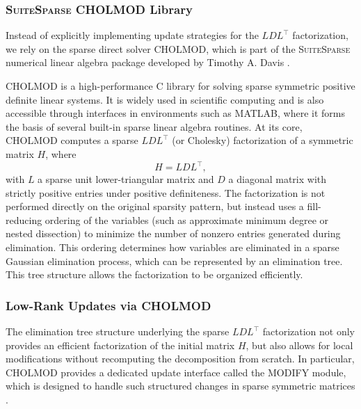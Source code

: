 \documentclass{book}
\theoremstyle{definition}
\numberwithin{algorithm_}{chapter}
\begin{document}
{\subsubsection*{\textsc{SuiteSparse} \textsc{CHOLMOD} Library}

Instead of explicitly implementing update strategies for the \(LDL^\top\) factorization, we rely on the sparse direct solver \textsc{CHOLMOD}, which is part of the \textsc{SuiteSparse} numerical linear algebra package developed by Timothy A. Davis \cite{davis2006direct,davis1999modifying, chen2008cholmod}.

\bigskip

\textsc{CHOLMOD} is a high-performance C library for solving sparse symmetric positive definite linear systems. It is widely used in scientific computing and is also accessible through interfaces in environments such as MATLAB, where it forms the basis of several built-in sparse linear algebra routines.
At its core, \textsc{CHOLMOD} computes a sparse \(LDL^\top\) (or Cholesky) factorization of a symmetric matrix \(H\), where
\[
H = L D L^\top,
\]
with \(L\) a sparse unit lower-triangular matrix and \(D\) a diagonal matrix with strictly positive entries under positive definiteness. The factorization is not performed directly on the original sparsity pattern, but instead uses a fill-reducing ordering of the variables (such as approximate minimum degree \cite{amestoy1996amd} or nested dissection) to minimize the number of nonzero entries generated during elimination.
This ordering determines how variables are eliminated in a sparse Gaussian elimination process, which can be represented by an elimination tree. This tree structure allows the factorization to be organized efficiently.



\subsubsection*{Low-Rank Updates via \textsc{CHOLMOD}}

The elimination tree structure underlying the sparse $LDL^\top$ factorization not only provides an efficient factorization of the initial matrix $H$, but also allows for local modifications without recomputing the decomposition from scratch. In particular, \textsc{CHOLMOD} provides a dedicated update interface called the \textsc{MODIFY} module, which is designed to handle such structured changes in sparse symmetric matrices \cite{davis2001multiple, davis2005row}.

}
\end{document}
